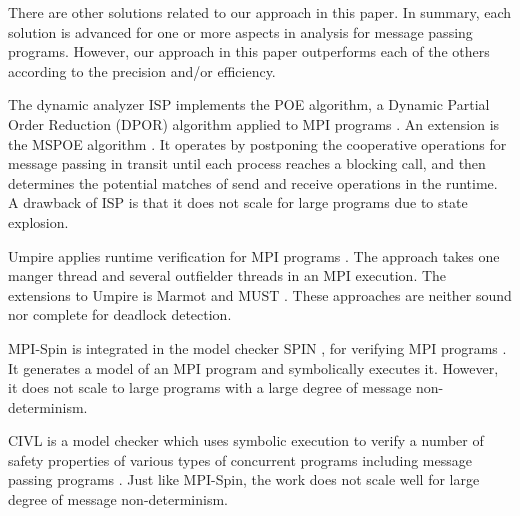 

There are other solutions related to our approach in this paper. In summary, each solution is advanced for one or more aspects in analysis for message passing programs. However, our approach in this paper outperforms each of the others according to the precision and/or efficiency. 

The dynamic analyzer ISP implements the POE algorithm, a Dynamic Partial Order Reduction (DPOR) algorithm \cite{DBLP:conf/popl/FlanaganG05} applied to MPI programs \cite{DBLP:conf/ppopp/VakkalankaSGK08}. 
An extension is the MSPOE algorithm \cite{DBLP:conf/sbmf/SharmaGB12}. It operates by postponing the cooperative operations for message passing in transit until each process reaches a blocking call, and then determines the potential matches of send and receive operations in the runtime. 
A drawback of ISP is that it does not scale for large programs due to state explosion.

Umpire applies runtime verification for MPI programs \cite{DBLP:conf/sc/VetterS00}. The approach takes one manger thread and several outfielder threads in an MPI execution. %
The extensions to Umpire is Marmot \cite{DBLP:conf/parco/KrammerBMR03} and MUST \cite{DBLP:conf/ptw/HilbrichSSM09}. These approaches are neither sound nor complete for deadlock detection.


MPI-Spin is integrated in the model checker SPIN \cite{DBLP:journals/tse/Holzmann97}, for verifying MPI programs \cite{DBLP:conf/vmcai/Siegel07,DBLP:conf/pvm/Siegel07}. It generates a model of an MPI program and symbolically executes it. However, it does not scale to large programs with a large degree of message non-determinism.

CIVL is a model checker which uses symbolic execution to verify a number of safety properties of various types of concurrent programs including message passing programs \cite{DBLP:conf/kbse/ZhengRLDS15,DBLP:conf/sc/SiegelZLZMEDR15}. Just like MPI-Spin, the work does not scale well for large degree of message non-determinism.

